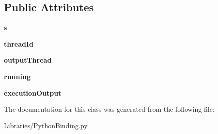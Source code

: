 \subsection*{Public Attributes}
\begin{DoxyCompactItemize}
\item 
{\bfseries s}\hypertarget{class_libraries_1_1_python_binding_1_1___ccs_python_executor_thread_a43b8a87321e281e114153f91bf6aab44}{}\label{class_libraries_1_1_python_binding_1_1___ccs_python_executor_thread_a43b8a87321e281e114153f91bf6aab44}

\item 
{\bfseries thread\+Id}\hypertarget{class_libraries_1_1_python_binding_1_1___ccs_python_executor_thread_ade5230fa30b5a8bc0e0a7f16d93b08c7}{}\label{class_libraries_1_1_python_binding_1_1___ccs_python_executor_thread_ade5230fa30b5a8bc0e0a7f16d93b08c7}

\item 
{\bfseries output\+Thread}\hypertarget{class_libraries_1_1_python_binding_1_1___ccs_python_executor_thread_a7270394e932f6bfb3b6a9592324e66fa}{}\label{class_libraries_1_1_python_binding_1_1___ccs_python_executor_thread_a7270394e932f6bfb3b6a9592324e66fa}

\item 
{\bfseries running}\hypertarget{class_libraries_1_1_python_binding_1_1___ccs_python_executor_thread_ab4afdb0635c0f5b70b616ad16cce2914}{}\label{class_libraries_1_1_python_binding_1_1___ccs_python_executor_thread_ab4afdb0635c0f5b70b616ad16cce2914}

\item 
{\bfseries execution\+Output}\hypertarget{class_libraries_1_1_python_binding_1_1___ccs_python_executor_thread_a1dddcb68f9ef2cdbba46b3ea043e3223}{}\label{class_libraries_1_1_python_binding_1_1___ccs_python_executor_thread_a1dddcb68f9ef2cdbba46b3ea043e3223}

\end{DoxyCompactItemize}


The documentation for this class was generated from the following file\+:\begin{DoxyCompactItemize}
\item 
Libraries/Python\+Binding.\+py\end{DoxyCompactItemize}
